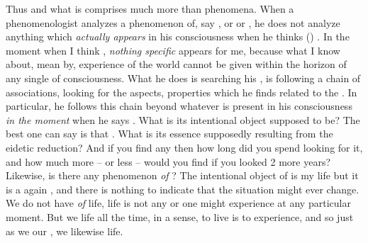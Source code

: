 \pa
Thus  and what is 
comprises much more than phenomena.  When a phenomenologist analyzes a
phenomenon of, say , or  or , he does not
analyze anything which {\em actually appears} in his consciousness when he
thinks () .  In the moment when I think , {\em
  nothing specific} appears for me, because what I know about, mean by,
experience of the world cannot be given within the horizon of any single
 of consciousness.  What he does is searching his , is
following a chain of associations, looking for the aspects, properties which he
finds related to the .  In particular, he follows this chain beyond
whatever is present in his consciousness {\em in the moment} when he says
.  What is its intentional object supposed to be?  The best one can say
is that .  What is its essence supposedly resulting from the eidetic reduction?
And if you find any then how long did you spend looking for it, and how much
more -- or less -- would you find if you looked 2 more years?
Likewise, is there any phenomenon {\em of} ?  The intentional object
of  is my life but it is a again
, and there is nothing to
indicate that the situation might ever change.  We do not have  {\em of} life, life is not any  or  one might
experience at any 
particular moment. But we  life all the time, in a sense, to live is
to experience, and so just as we  our , we
likewise  life.
%

